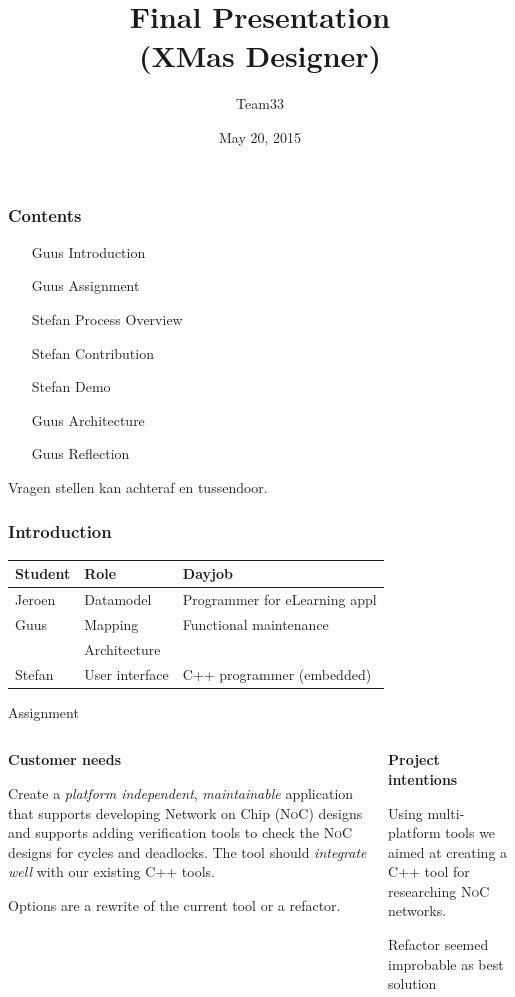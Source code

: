 \documentclass[11pt]{beamer}
\author{Team33}
\title{Final Presentation\\(XMas Designer)}
\institute{Open University/\\Guus Bonnema, Stefan Versluys, Jeroen Kleijn}
\date{May 20, 2015}
\begin{document}
\newcommand{\Noc}{\textsc{NoC}\xspace}
\newcommand{\qt}{\textsc{Qt}\xspace}
\newcommand{\qml}{\textsc{Qml}\xspace}

\begin{frame}
	\titlepage
\end{frame}

\begin{frame}
	\frametitle{Contents}
	\begin{itemize}
		\item [Guus] Introduction 
		\item [Guus] Assignment
		\item [Stefan] Process Overview
		\item [Stefan] Contribution
		\item [Stefan] Demo
		\item [Guus] Architecture
		\item [Guus] Reflection
	\end{itemize}
	
	Vragen stellen kan achteraf en tussendoor.
	
\end{frame}

\begin{frame}
	\frametitle{Introduction}
	\begin{tabular}{lp{2.5cm}p{4cm}}
	\hline
	{\bf Student} & {\bf Role}      & {\bf Dayjob}\\\hline
	Jeroen        &  Datamodel      & Programmer for eLearning appl\\
	Guus		  &  Mapping        & Functional maintenance\\
	              &  Architecture   &                       \\
	Stefan        &  User interface & C++ programmer (embedded)\\
	\hline
	\end{tabular}
\end{frame}

\begin{frame}{Assignment}
	\begin{columns}
		\begin{column}[t]{5cm}
		{\bf Customer needs}

		Create a {\it platform independent}, {\it maintainable} application that supports
		developing Network on Chip (\Noc) designs and supports adding verification tools
		to check the \Noc designs for cycles and deadlocks. The tool should {\it integrate well}
		with our existing C++ tools.
		
		Options are a rewrite
		of the current tool or a refactor.
		\end{column}
		\begin{column}[t]{5cm}
		{\bf Project intentions}		
		
		Using multi-platform tools we aimed at creating a C++ tool for researching \Noc networks.
		
		Refactor seemed improbable as best solution
		\end{column}
	\end{columns}
\end{frame}
\end{document}
